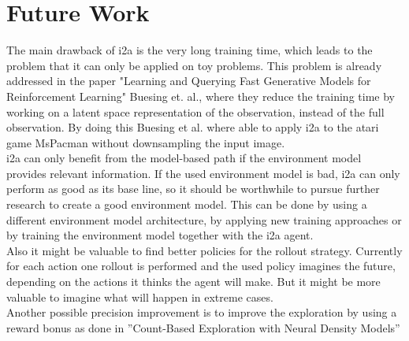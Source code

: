 \section{Future Work}

The main drawback of i2a is the very long training time, which leads to the problem that it can only be applied on toy problems. This problem is already addressed in the paper "Learning and Querying Fast Generative Models for Reinforcement Learning" \cite{LearningAndQueryingFasGenerativeModels} Buesing et. al., where they reduce the training time by working on a latent space representation of the observation, instead of the full observation. By doing this Buesing et al. where able to apply i2a to the atari game MsPacman without downsampling the input image.\\


i2a can only benefit from the model-based path if the environment model provides relevant information. 
If the used environment model is bad, i2a can only perform as good as its base line, so it should be worthwhile to pursue further research to create a good environment model.
This can be done by using a different environment model architecture, by applying new training approaches or by training the environment model together with the i2a agent.\\

Also it might be valuable to find better policies for the rollout strategy. Currently for each action one rollout is performed and the used policy imagines the future, depending on the actions it thinks the agent will make. But it might be more valuable to imagine what will happen in extreme cases.\\

Another possible precision improvement is to improve the exploration by using a reward bonus as done in ”Count-Based Exploration with Neural Density Models” \cite{CountBasedExploration}




